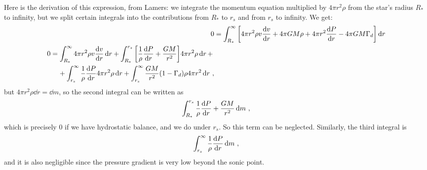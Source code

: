 \documentclass[main.tex]{subfiles}
\begin{document}
\begin{bluebox}
Here is the derivation of this expression, from Lamers:
we integrate the momentum equation multiplied by \(4 \pi r^2 \rho \) from the star's radius \(R_{*}\) to infinity, but we split certain integrals into the contributions from \(R_{*}\) to \(r_s\) and from \(r_s\) to infinity. We get: 
%
\begin{subequations}
\begin{align}
0 &= \int_{R_*}^{ \infty } \qty[ 4 \pi r^2 \rho  v \dv{v}{r} + 4 \pi GM \rho    
+ 4 \pi r^2 \dv{P}{r} - 4 \pi GM \Gamma_{d}] \dd{r}  \\
\begin{split}
0 &= \int_{R_*}^{ \infty } 4 \pi r^2 \rho  v \dv{v}{r} \dd{r}
+ \int_{R_*}^{r_s}  \qty[\frac{1}{\rho } \dv{P}{r} + \frac{GM}{r^2} ] 4 \pi r^2 \rho \dd{r} + \\
&\phantom{=}\ 
+ \int_{r_s}^{ \infty } \frac{1}{\rho } \dv{P}{r} 4 \pi r^2 \rho \dd{r} 
+ \int_{r_s}^{ \infty } \frac{GM}{r^2} (1 - \Gamma_{d})
\rho 4 \pi r^2 \dd{r} 
\,,
\end{split}
\end{align}
\end{subequations}
%
but \(4 \pi r^2 \rho \dd{r} = \dd{m}\), so the second integral can be written as 
%
\begin{align}
\int_{R_*}^{r_s} \frac{1}{\rho } \dv{P}{r}  + \frac{GM}{r^2}
 \dd{m}
\,,
\end{align}
%
which is precisely 0 if we have hydrostatic balance, and we do under \(r_s\). So this term can be neglected. 
Similarly, the third integral is 
%
\begin{align}
\int_{r_s}^{ \infty } \frac{1}{\rho } \dv{P}{r} \dd{m}
\,,
\end{align}
%
and it is also negligible since the pressure gradient is very low beyond the sonic point.


\end{bluebox}
\end{document}
